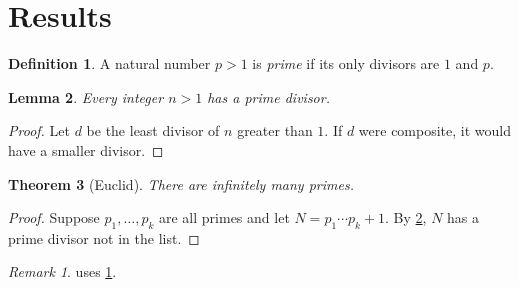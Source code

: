 \documentclass{article}
\theoremstyle{plain}\newtheorem{theorem}{Theorem}[section]\newtheorem{lemma}[theorem]{Lemma}
\theoremstyle{definition}\newtheorem{definition}[theorem]{Definition}
\theoremstyle{remark}\newtheorem*{remark}{Remark}
\begin{document}
\section{Results}
\begin{definition}\label{def:prime}A natural number $p>1$ is \emph{prime} if its only divisors are $1$ and $p$.\end{definition}
\begin{lemma}\label{lem:div}Every integer $n>1$ has a prime divisor.\end{lemma}
\begin{proof}Let $d$ be the least divisor of $n$ greater than $1$. If $d$ were composite, it would have a smaller divisor.\end{proof}
\begin{theorem}[Euclid]\label{thm:inf}There are infinitely many primes.\end{theorem}
\begin{proof}Suppose $p_1,\dots,p_k$ are all primes and let $N = p_1\cdots p_k + 1$. By \cref{lem:div}, $N$ has a prime divisor not in the list. \qedhere\end{proof}
\begin{remark} uses \cref{def:prime}.\end{remark}
\end{document}
